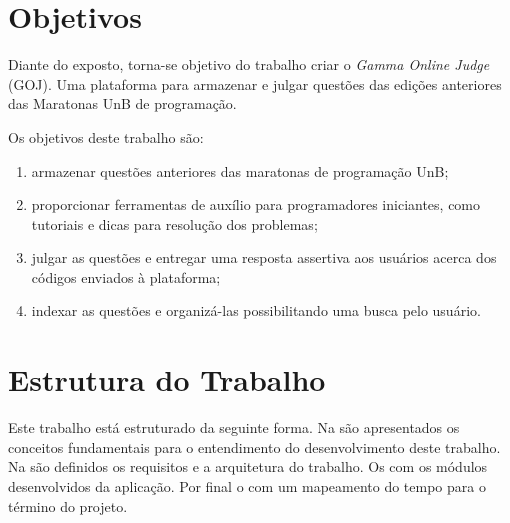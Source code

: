 \section{Objetivos}
\label{sec:objetivos}

Diante do exposto, torna-se objetivo do trabalho criar o \textit{Gamma Online Judge} (GOJ). Uma plataforma para armazenar e julgar questões das edições anteriores das Maratonas UnB de programação.

Os objetivos deste trabalho são: 
\begin{enumerate}
    \item armazenar questões anteriores das maratonas de programação UnB;
    \item proporcionar ferramentas de auxílio para programadores iniciantes, como tutoriais e dicas para resolução dos problemas;
    \item julgar as questões e entregar uma resposta assertiva aos usuários acerca dos códigos enviados à plataforma;
    \item indexar as questões e organizá-las possibilitando uma busca pelo usuário.
\end{enumerate}

\section{Estrutura do Trabalho}
\label{sec:estruturaDoTrabalho}

Este trabalho está estruturado da seguinte forma. Na  são apresentados os conceitos fundamentais para o entendimento do desenvolvimento deste trabalho. Na  são definidos os requisitos e a arquitetura do trabalho. Os  com os módulos desenvolvidos da aplicação. Por final o  com um mapeamento do tempo para o término do projeto.
